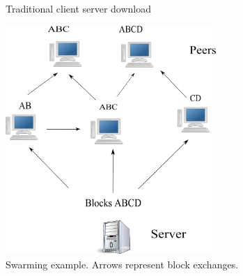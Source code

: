 \begin{figure}
  \caption{Traditional client server download}
\end{figure}

\begin{figure}
 \centering
 \includegraphics[width=8cm]{description_pics/normal_swarm.png}
 \caption{Swarming example.  Arrows represent block exchanges.}
 \label{fig:normal_swarm}
\end{figure}

